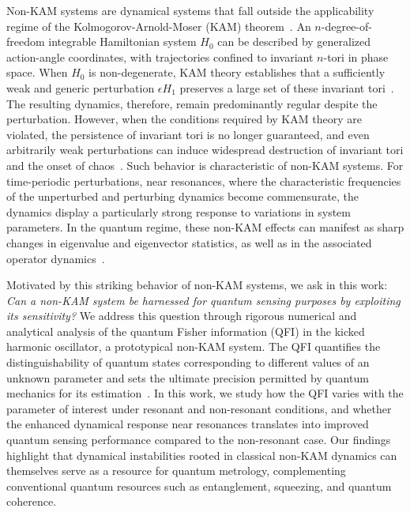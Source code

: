 \documentclass[amsmath,nobibnotes,aps,amssymb,pra, prl,aps,showpacs,superscriptaddress,twocolumn, longbibliography, reprint]{revtex4-2}
\begin{document}
Non-KAM systems are dynamical systems that fall outside the applicability regime of the Kolmogorov-Arnold-Moser (KAM) theorem~\cite{arnold2009proof, kolmogorov1954conservation, moser1967convergent, moser1962invariant}. An \(n\)-degree-of-freedom integrable Hamiltonian system \(H_0\) can be described by generalized action-angle coordinates, with trajectories confined to invariant \(n\)-tori in phase space. When \(H_0\) is non-degenerate, KAM theory establishes that a sufficiently weak and generic perturbation \(\epsilon H_1\) preserves a large set of these invariant tori~\cite{arnold2009proof, kolmogorov1954conservation, moser1962invariant, moser1967convergent, poschel2009lecture, Jesus2026arxive, Kumari2018pre}. The resulting dynamics, therefore, remain predominantly regular despite the perturbation. However, when the conditions required by KAM theory are violated, the persistence of invariant tori is no longer guaranteed, and even arbitrarily weak perturbations can induce widespread destruction of invariant tori and the onset of chaos~\cite{sankaranarayanan2001quantum, sankaranarayanan2001chaos, varikuti2023probing, varikuti2026instabilities, Jesus2026arxive, chinni2022trotter}. Such behavior is characteristic of non-KAM systems. For time-periodic perturbations, near resonances, where the characteristic frequencies of the unperturbed and perturbing dynamics become commensurate, the dynamics display a particularly strong response to variations in system parameters. In the quantum regime, these non-KAM effects can manifest as sharp changes in eigenvalue and eigenvector statistics, as well as in the associated operator dynamics~\cite{varikuti2023probing, varikuti2026instabilities}. %



Motivated by this striking behavior of non-KAM systems, we ask in this work: \textit{Can a non-KAM system be harnessed for quantum sensing purposes by exploiting its sensitivity?} We address this question through rigorous numerical and analytical analysis of the quantum Fisher information (QFI) in the kicked harmonic oscillator, a prototypical non-KAM system. The QFI quantifies the distinguishability of quantum states corresponding to different values of an unknown parameter and sets the ultimate precision permitted by quantum mechanics for its estimation~\cite{braunstein1994statistical}. In this work, we study how the QFI varies with the parameter of interest under resonant and non-resonant conditions, and whether the enhanced dynamical response near resonances translates into improved quantum sensing performance compared to the non-resonant case. Our findings highlight that dynamical instabilities rooted in classical non-KAM dynamics can themselves serve as a resource for quantum metrology, complementing conventional quantum resources such as entanglement, squeezing, and quantum coherence.
\end{document}
